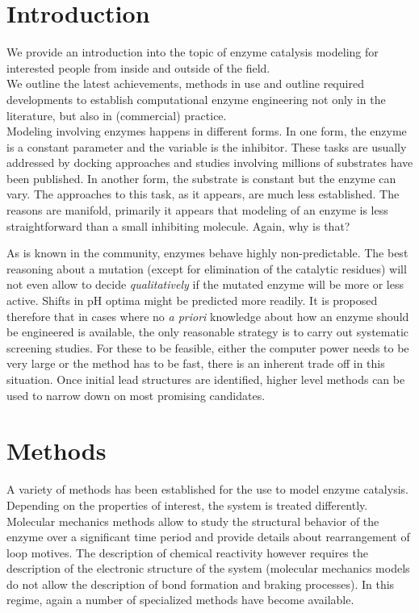 \section{Introduction}\label{sec:intro}
We provide an introduction into the topic of enzyme catalysis modeling for interested people from inside and outside of the field.\\
We outline the latest achievements, methods in use and outline required developments to establish computational enzyme engineering not only in the literature, but also in (commercial) practice.\\
Modeling involving enzymes happens in different forms.
In one form, the enzyme is a constant parameter and the variable is the inhibitor.
These tasks are usually addressed by docking approaches and studies involving millions of substrates have been published\cite{zhou2010high}.
In another form, the substrate is constant but the enzyme can vary.
The approaches to this task, as it appears, are much less established.
The reasons are manifold, primarily it appears that modeling of an enzyme is less straightforward than a small inhibiting molecule.
Again, why is that?

As is known in the community, enzymes behave highly non-predictable.
The best reasoning about a mutation (except for elimination of the catalytic residues) will not even allow to decide \textit{qualitatively} if the mutated enzyme will be more or less active.
Shifts in pH optima might be predicted more readily\cite{ludwiczek2013strategies}.
It is proposed therefore that in cases where no \textit{a priori} knowledge about how an enzyme should be engineered is available, the only reasonable strategy is to carry out systematic screening studies.
For these to be feasible, either the computer power needs to be very large or the method has to be fast, there is an inherent trade off in this situation.
Once initial lead structures are identified, higher level methods can be used to narrow down on most promising candidates.


\section{Methods}\label{sec:methods}
A variety of methods has been established for the use to model enzyme catalysis.
Depending on the properties of interest, the system is treated differently.
Molecular mechanics methods allow to study the structural behavior of the enzyme over a significant time period and provide details about rearrangement of loop motives.
The description of chemical reactivity however requires the description of the electronic structure of the system (molecular mechanics models do not allow the description of bond formation and braking processes).
In this regime, again a number of specialized methods have become available.

